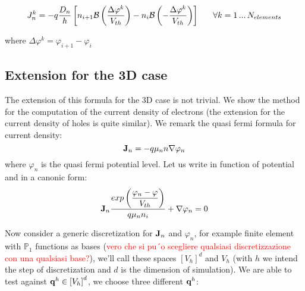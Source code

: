 \begin{center}


\end{center}

 \begin{equation}
\label{eq: scharfetter gummel 1D electron}
J_n^k=-q\frac{D_n}{h}
\left[ n_{i+1}\mathcal{B}\left(\frac{\Delta \varphi^k}{V_{th}}\right)- n_i\mathcal{B}\left(-\frac{\Delta \varphi^k}{V_{th}}\right)\right]  \psp{10} \forall k = 1 \, ... \, N_{elements}
\end{equation}

where $\Delta \varphi^k = \varphi_{i+1}-\varphi_i$


\subsection{Extension for the 3D case}
 
The extension of this formula for the 3D case is not trivial. We show the method for the computation of the current density of electrons (the extension for the current density of holes is quite similar).
We remark the quasi fermi formula for current density:
\begin{equation}
\label{eq: current density fermi}
\mathbf{J}_n=-q \mu_n n \nabla \varphi_n
\end{equation}
where $\varphi_n$ is the quasi fermi potential level. Let us write  in function of potential and in a canonic form:
\begin{equation}
\label{eq: current density canonic form}
\mathbf{J}_n\dfrac{ exp\left(\dfrac{\varphi_n-\varphi}{V_{th}}\right)}{q \mu_n n_i} + \nabla \varphi_n = 0
\end{equation}

Now consider a generic discretization for $\mathbf{J}_n$ and $\varphi_n$, for example finite element with $\mathbb{P}_1$ functions as bases (\textcolor{red}{vero che si pu´o scegliere qualsiasi discretizzazione con una qualsiasi base?}), we'll call these spaces $\left[ V_h \right]^d$ and $V_h$ (with $h$ we intend the step of discretization and $d$ is the dimension of simulation). We are able to test  against $\mathbf{q}^h \in \left[ V_h \right]^d$, we choose three  different $\mathbf{q}^h$:


